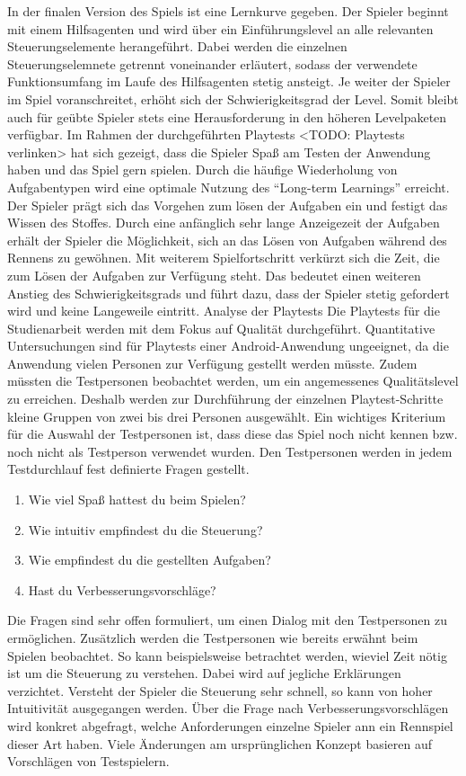 In der finalen Version des Spiels ist eine Lernkurve gegeben. Der Spieler beginnt mit einem Hilfsagenten und wird über ein Einführungslevel an alle relevanten Steuerungselemente herangeführt. Dabei werden die einzelnen Steuerungselemnete getrennt voneinander erläutert, sodass der verwendete Funktionsumfang im Laufe des Hilfsagenten stetig ansteigt. Je weiter der Spieler im Spiel voranschreitet, erhöht sich der Schwierigkeitsgrad der Level. Somit bleibt auch für geübte Spieler stets eine Herausforderung in den höheren Levelpaketen verfügbar. Im Rahmen der durchgeführten Playtests <TODO: Playtests verlinken> hat sich gezeigt, dass die Spieler Spaß am Testen der Anwendung haben und das Spiel gern spielen. Durch die häufige Wiederholung von Aufgabentypen wird eine optimale Nutzung des \enquote{Long-term Learnings} erreicht. Der Spieler prägt sich das Vorgehen zum lösen der Aufgaben ein und festigt das Wissen des Stoffes. Durch eine anfänglich sehr lange Anzeigezeit der Aufgaben erhält der Spieler die Möglichkeit, sich an das Lösen von Aufgaben während des Rennens zu gewöhnen. Mit weiterem Spielfortschritt verkürzt sich die Zeit, die zum Lösen der Aufgaben zur Verfügung steht. Das bedeutet einen weiteren Anstieg des Schwierigkeitsgrads und führt dazu, dass der Spieler stetig gefordert wird und keine Langeweile eintritt.
Analyse der Playtests
Die Playtests für die Studienarbeit werden mit dem Fokus auf Qualität durchgeführt. Quantitative Untersuchungen sind für Playtests einer Android-Anwendung ungeeignet, da die Anwendung vielen Personen zur Verfügung gestellt werden müsste. Zudem müssten die Testpersonen beobachtet werden, um ein angemessenes Qualitätslevel zu erreichen. Deshalb werden zur Durchführung der einzelnen Playtest-Schritte kleine Gruppen von zwei bis drei Personen ausgewählt. Ein wichtiges Kriterium für die Auswahl der Testpersonen ist, dass diese das Spiel noch nicht kennen bzw. noch nicht als Testperson verwendet wurden.
Den Testpersonen werden in jedem Testdurchlauf fest definierte Fragen gestellt. 
\begin{enumerate}
    \item{Wie viel Spaß hattest du beim Spielen?}
    \item{Wie intuitiv empfindest du die Steuerung?}
    \item{Wie empfindest du die gestellten Aufgaben?}
    \item{Hast du Verbesserungsvorschläge?}
\end{enumerate}
Die Fragen sind sehr offen formuliert, um einen Dialog mit den Testpersonen zu ermöglichen. Zusätzlich werden die Testpersonen wie bereits erwähnt beim Spielen beobachtet. So kann beispielsweise betrachtet werden, wieviel Zeit nötig ist um die Steuerung zu verstehen. Dabei wird auf jegliche Erklärungen verzichtet. Versteht der Spieler die Steuerung sehr schnell, so kann von hoher Intuitivität ausgegangen werden. Über die Frage nach Verbesserungsvorschlägen wird konkret abgefragt, welche Anforderungen einzelne Spieler ann ein Rennspiel dieser Art haben. Viele Änderungen am ursprünglichen Konzept basieren auf Vorschlägen von Testspielern.
